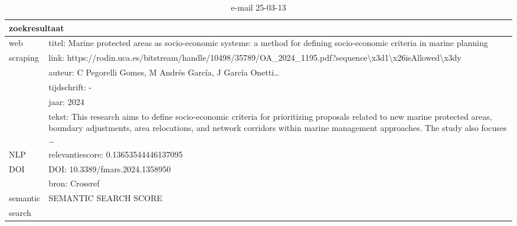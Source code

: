 \begin{table}[h!]
    \caption{e-mail 25-03-13}
    \centering
    \begin{tabularx}{\textwidth}{|p{4cm}|X|} 
        \hline
        \multicolumn{2}{|X|}{\textbf{zoekresultaat}} \\
        \hline
        web &titel: Marine protected areas as socio-economic systems: a method for defining socio-economic criteria in marine planning\\
        scraping&link: https://rodin.uca.es/bitstream/handle/10498/35789/OA_2024_1195.pdf?sequence\textbackslash x3d1\textbackslash x26isAllowed\textbackslash x3dy\\
        &auteur: C Pegorelli Gomes, M Andrés García, J García Onetti…\\
        &tijdschrift: -\\
        &jaar: 2024\\
        &tekst: This research aims to define socio-economic criteria for prioritizing proposals related to new marine protected areas, boundary adjustments, area relocations, and network corridors within marine management approaches. The study also focuses …\\
        \hline
        NLP&relevantiescore: 0.13653544446137095\\
        \hline
        DOI&DOI: 10.3389/fmars.2024.1358950\\
        &bron: Crossref\\
        \hline
        semantic&SEMANTIC SEARCH SCORE\\
        search&\\
        \hline
    \end{tabularx}
    \label{table:email20250313}
\end{table}
